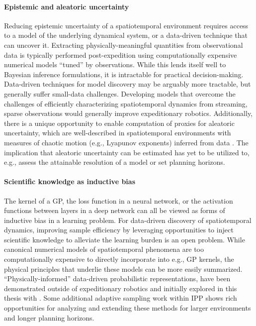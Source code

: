 \paragraph{Epistemic and aleatoric uncertainty}
Reducing epistemic uncertainty of a spatiotemporal environment requires access to a model of the underlying dynamical system, or a data-driven technique that can uncover it. Extracting physically-meaningful quantities from observational data is typically performed post-expedition using computationally expensive numerical models ``tuned'' by observations. While this lends itself well to Bayesian inference formulations, it is intractable for practical decision-making. Data-driven techniques for model discovery \autocite{raissi2019physics} may be arguably more tractable, but generally suffer small-data challenges. Developing models that overcome the challenges of efficiently characterizing spatiotemporal dynamics from streaming, sparse observations would generally improve expeditionary robotics. Additionally, there is a unique opportunity to enable computation of proxies for aleatoric uncertainty, which are well-described in spatiotemporal environments with measures of chaotic motion (e.g., Lyapunov exponents) inferred from data \autocite{blanchard2019analytical}. The implication that aleatoric uncertainty can be estimated has yet to be utilized to, e.g., assess the attainable resolution of a model or set planning horizons.

\paragraph{Scientific knowledge as inductive bias}
The kernel of a GP, the loss function in a neural network, or the activation functions between layers in a deep network can all be viewed as forms of inductive bias in a learning problem. For data-driven discovery of spatiotemporal dynamics, improving sample efficiency by leveraging opportunities to inject scientific knowledge to alleviate the learning burden is an open problem. While canonical numerical models of spatiotemporal phenomena are too computationally expensive to directly incorporate into e.g., GP kernels, the physical principles that underlie these models can be more easily summarized. ``Physically-informed'' data-driven probabilistic representations, have been demonstrated outside of expeditionary robotics \autocite{raissi2019physics} and initially explored in this thesis with \PHUMES. Some additional adaptive sampling work within IPP \autocite{salam2019adaptive} shows rich opportunities for analyzing and extending these methods for larger environments and longer planning horizons.


